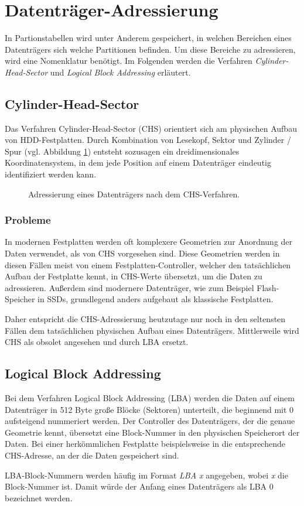 \section{Datenträger-Adressierung}
\label{sec:addressing}
In Partionstabellen wird unter Anderem gespeichert, in welchen Bereichen eines Datenträgers sich welche Partitionen befinden.
Um diese Bereiche zu adressieren, wird eine Nomenklatur benötigt.
Im Folgenden werden die Verfahren \textit{Cylinder-Head-Sector} und \textit{Logical Block Addressing} erläutert.

\subsection{Cylinder-Head-Sector}
\label{sec:addressing:chs}
Das Verfahren Cylinder-Head-Sector (CHS) orientiert sich am physischen Aufbau von HDD-Festplatten.
Durch Kombination von Lesekopf, Sektor und Zylinder / Spur (vgl. Abbildung \ref{fig:chs}) entsteht sozusagen ein dreidimensionales Koordinatensystem, in dem jede Position auf einem Datenträger eindeutig identifiziert werden kann.

\begin{figure}[ht]
    \centering
    \fbox{}
    \caption{Adressierung eines Datenträgers nach dem CHS-Verfahren. \cite{wikipedia-chs}}
    \label{fig:chs}
\end{figure}

\subsubsection{Probleme}
In modernen Festplatten werden oft komplexere Geometrien zur Anordnung der Daten verwendet, als von CHS vorgesehen sind.
Diese Geometrien werden in diesen Fällen meist von einem Festplatten-Controller, welcher den tatsächlichen Aufbau der Festplatte kennt, in CHS-Werte übersetzt, um die Daten zu adressieren.\cite{pollard2011}
Außerdem sind modernere Datenträger, wie zum Beispiel Flash-Speicher in SSDs, grundlegend anders aufgebaut als klassische Festplatten.

Daher entspricht die CHS-Adressierung heutzutage nur noch in den seltensten Fällen dem tatsächlichen physischen Aufbau eines Datenträgers. 
Mittlerweile wird CHS als obsolet angesehen und durch LBA ersetzt.


\subsection{Logical Block Addressing}
\label{sec:addressing:lba}
Bei dem Verfahren Logical Block Addressing (LBA) werden die Daten auf einem Datenträger in 512 Byte große Blöcke (Sektoren) unterteilt, die beginnend mit 0 aufsteigend nummeriert werden.
Der Controller des Datenträgers, der die genaue Geometrie kennt, übersetzt eine Block-Nummer in den physischen Speicherort der Daten.
Bei einer herkömmlichen Festplatte beispielsweise in die entsprechende CHS-Adresse, an der die Daten gespeichert sind.

LBA-Block-Nummern werden häufig im Format \textit{LBA x} angegeben, wobei \textit{x} die Block-Nummer ist.
Damit würde der Anfang eines Datenträgers als LBA 0 bezeichnet werden.
